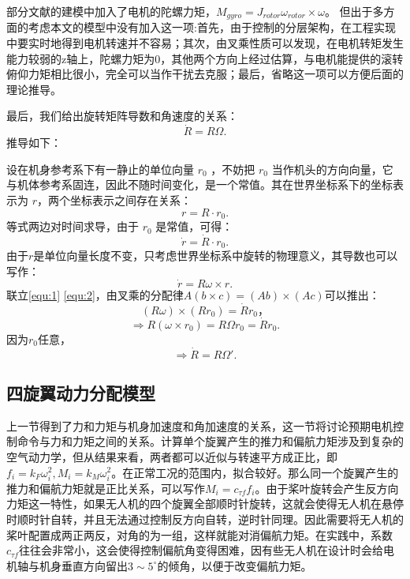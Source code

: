 部分文献的建模中加入了电机的陀螺力矩\cite{quanbook}，$M_{gyro}=J_{rotor} \omega_{rotor} \times \omega$。 但出于多方面的考虑本文的模型中没有加入这一项:首先，由于控制的分层架构，在工程实现中要实时地得到电机转速并不容易；其次，由叉乘性质可以发现，在电机转矩发生能力较弱的z轴上，陀螺力矩为$0$，其他两个方向上经过估算，与电机能提供的滚转俯仰力矩相比很小，完全可以当作干扰去克服；最后，省略这一项可以方便后面的理论推导。

最后，我们给出旋转矩阵导数和角速度的关系：
  \begin{equation}
    \dot R=R\Omega.
    \label{equ:dotR}
  \end{equation}
推导如下：

设在机身参考系下有一静止的单位向量 $r_0$ ，不妨把 $r_0$ 当作机头的方向向量，它与机体参考系固连，因此不随时间变化，是一个常值。其在世界坐标系下的坐标表示为 $r$，两个坐标表示之间存在关系：
  $$r=R \cdot r_0.$$
等式两边对时间求导，由于 $r_0$ 是常值，可得：
  \begin{equation}
    \dot r= \dot R \cdot r_0.
    \label{equ:1}
  \end{equation}
由于$r$是单位向量长度不变，只考虑世界坐标系中旋转的物理意义，其导数也可以写作：
  \begin{equation}
    \dot r=R \omega \times r.
    \label{equ:2}
  \end{equation}
联立\ref{equ:1}  \ref{equ:2}，由叉乘的分配律$A(b\times c)=(Ab)\times (Ac)$可以推出：
$$(R\omega)\times(Rr_0)=\dot R r_0，$$
$$\Rightarrow R(\omega \times r_0)=R\Omega r_0=\dot R r_0.$$
因为$r_0$任意，
$$\Rightarrow \dot R=R \Omega'.$$

\subsection*{四旋翼动力分配模型}
上一节得到了力和力矩与机身加速度和角加速度的关系，这一节将讨论预期电机控制命令与力和力矩之间的关系。计算单个旋翼产生的推力和偏航力矩涉及到复杂的空气动力学，但从结果来看，两者都可以近似与转速平方成正比\cite{minimumsnap}，即$f_i=k_F \omega_i^2,M_i=k_M \omega_i^2$。在正常工况的范围内，拟合较好。那么同一个旋翼产生的推力和偏航力矩就是正比关系，可以写作$M_i=c_{\tau f}f_i$。由于桨叶旋转会产生反方向力矩这一特性，如果无人机的四个旋翼全部顺时针旋转，这就会使得无人机在悬停时顺时针自转，并且无法通过控制反方向自转，逆时针同理。因此需要将无人机的桨叶配置成两正两反，对角的为一组，这样就能对消偏航力矩。在实践中，系数$c_{\tau f}$往往会非常小，这会使得控制偏航角变得困难，因有些无人机在设计时会给电机轴与机身垂直方向留出$3\sim5^\circ$的倾角，以便于改变偏航力矩。

